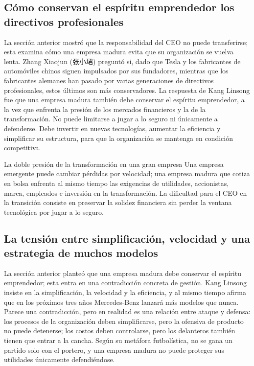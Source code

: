 \documentclass[a4paper]{article}
\begin{document}
\subsection{Cómo conservan el espíritu emprendedor los directivos profesionales}

La sección anterior mostró que la responsabilidad del CEO no puede transferirse; esta examina cómo una empresa madura evita que su organización se vuelva lenta. Zhang Xiaojun (张小珺) preguntó si, dado que Tesla y los fabricantes de automóviles chinos siguen impulsados por sus fundadores, mientras que los fabricantes alemanes han pasado por varias generaciones de directivos profesionales, estos últimos son más conservadores. La respuesta de Kang Linsong fue que una empresa madura también debe conservar el espíritu emprendedor, a la vez que enfrenta la presión de los mercados financieros y la de la transformación. No puede limitarse a jugar a lo seguro ni únicamente a defenderse. Debe invertir en nuevas tecnologías, aumentar la eficiencia y simplificar su estructura, para que la organización se mantenga en condición competitiva.

\begin{warningbox}{La doble presión de la transformación en una gran empresa}
Una empresa emergente puede cambiar pérdidas por velocidad; una empresa madura que cotiza en bolsa enfrenta al mismo tiempo las exigencias de utilidades, accionistas, marca, empleados e inversión en la transformación. La dificultad para el CEO en la transición consiste en preservar la solidez financiera sin perder la ventana tecnológica por jugar a lo seguro.
\end{warningbox}

\subsection{La tensión entre simplificación, velocidad y una estrategia de muchos modelos}

La sección anterior planteó que una empresa madura debe conservar el espíritu emprendedor; esta entra en una contradicción concreta de gestión. Kang Linsong insiste en la simplificación, la velocidad y la eficiencia, y al mismo tiempo afirma que en los próximos tres años Mercedes-Benz lanzará más modelos que nunca. Parece una contradicción, pero en realidad es una relación entre ataque y defensa: los procesos de la organización deben simplificarse, pero la ofensiva de producto no puede detenerse; los costos deben controlarse, pero los delanteros también tienen que entrar a la cancha. Según su metáfora futbolística, no se gana un partido solo con el portero, y una empresa madura no puede proteger sus utilidades únicamente defendiéndose.
\end{document}
